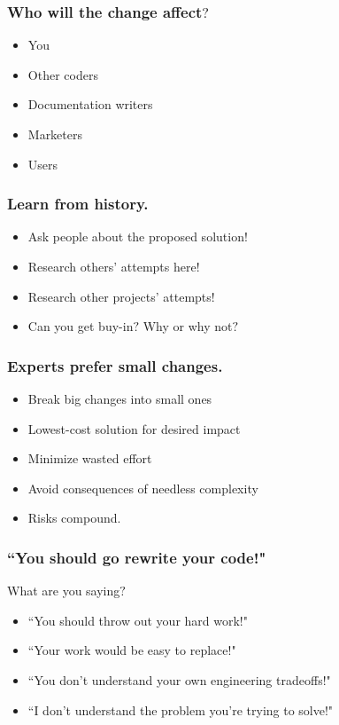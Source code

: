 \documentclass{beamer}
\begin{document}
\begin{frame}[fragile]
\frametitle{Who will the change affect$?$}
\begin{itemize}[<+(1)->]
\item You
\item Other coders
\item Documentation writers
\item Marketers
\item Users
\end{itemize}
\end{frame}

\begin{frame}[fragile]
\frametitle{Learn from history.}
\begin{itemize}[<+(1)->]
\item Ask people about the proposed solution!
\item Research others' attempts here!
\item Research other projects' attempts!
\item Can you get buy-in$?$ Why or why not$?$
\end{itemize}
\end{frame}

\begin{frame}[fragile]
\frametitle{Experts prefer small changes.}
\begin{itemize}[<+(1)->]
\item Break big changes into small ones
\item Lowest-cost solution for desired impact
\item Minimize wasted effort
\item Avoid consequences of needless complexity
\item Risks compound.
\end{itemize}
\end{frame}

\begin{frame}[fragile]
\frametitle{``You should go rewrite your code!"}
What are you saying$?$
\begin{itemize}[<+(1)->]
\item ``You should throw out your hard work!"
\item ``Your work would be easy to replace!"
\item ``You don't understand your own engineering tradeoffs!"
\item ``I don't understand the problem you're trying to solve!"
\end{itemize}
\end{frame}
\end{document}
